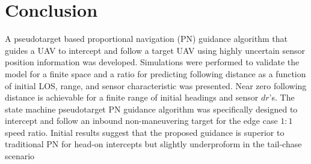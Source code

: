 \documentclass[conference]{IEEEtran}
\begin{document}
\section{Conclusion}





A pseudotarget based proportional navigation (PN) guidance algorithm that guides a UAV to intercept and follow a target UAV using highly uncertain sensor position information was developed. Simulations were performed to validate the model for a finite space and a ratio for predicting following distance as a function of initial LOS, range, and sensor characteristic was presented. Near zero following distance is achievable for a finite range of initial headings and sensor $dr$'s. The state machine pseudotarget PN guidance algorithm was specifically designed to intercept and follow an inbound non-maneuvering target for the edge case $1:1$ speed ratio. Initial results suggest that the proposed guidance is superior to traditional PN for head-on intercepts but slightly underproform in the tail-chase scenario 
\end{document}
